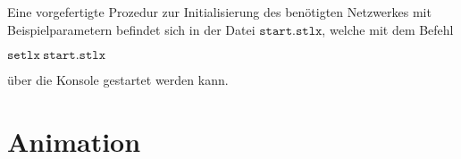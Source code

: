\noindent
Eine vorgefertigte Prozedur zur Initialisierung des benötigten Netzwerkes mit Beispielparametern befindet sich in der Datei $\mathtt{start.stlx}$, welche mit dem Befehl 
\begin{center}
	$\mathtt{setlx\ start.stlx}$ 
\end{center}
über die Konsole gestartet werden kann.

\section{Animation}
